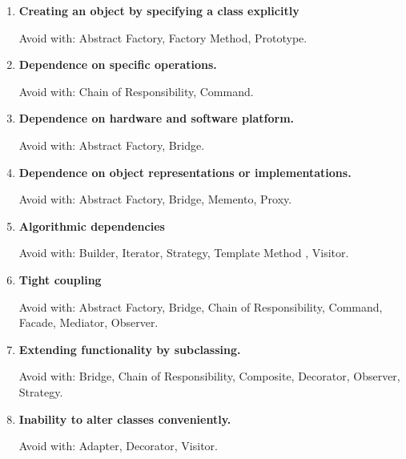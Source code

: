 \documentclass{article}
\begin{document}
\begin{enumerate}
    \item \textbf{Creating an object by specifying a class explicitly}
    
    Avoid with: Abstract Factory, Factory Method, Prototype. 
    
    \item \textbf{Dependence on specific operations.}
    
    Avoid with: Chain of Responsibility, Command.
    
    \item \textbf{Dependence on hardware and software platform.}
    
    Avoid with: Abstract Factory, Bridge.
    
    \item \textbf{Dependence on object representations or implementations.}
    
    Avoid with: Abstract Factory, Bridge, Memento, Proxy.
    
    \item \textbf{Algorithmic dependencies}
    
    Avoid with: Builder, Iterator, Strategy, Template Method , Visitor.
    
    \item \textbf{Tight coupling}
    
    Avoid with: Abstract Factory, Bridge, Chain of Responsibility, Command, Facade, Mediator, Observer.
    
    \item \textbf{Extending functionality by subclassing.}
    
    Avoid with: Bridge, Chain of Responsibility, Composite,  Decorator, Observer, Strategy.
    
    \item \textbf{Inability to alter classes conveniently.}
    
    Avoid with: Adapter, Decorator, Visitor.
\end{enumerate}
\end{document}
